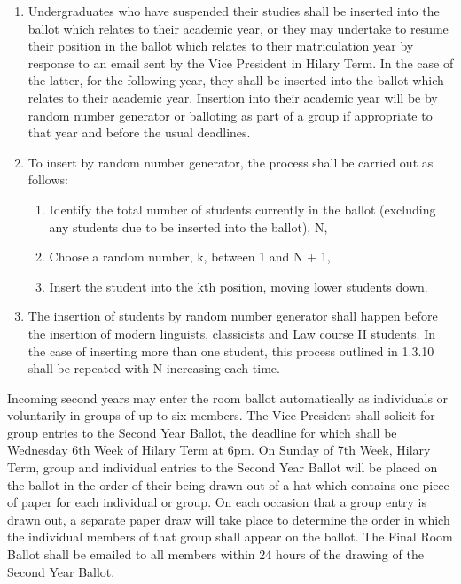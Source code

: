 \begin{enumerate}
\item Undergraduates who have suspended their studies shall be inserted into the ballot which relates to their academic year, or they may undertake to resume their position in the ballot which relates to their matriculation year by response to an email sent by the Vice President in Hilary Term. In the case of the latter, for the following year, they shall be inserted into the ballot which relates to their academic year. Insertion into their academic year will be by random number generator or balloting as part of a group if appropriate to that year and before the usual deadlines.
\item To insert by random number generator, the process shall be carried out as follows:
\begin{enumerate}
\item Identify the total number of students currently in the ballot (excluding any students due to be inserted into the ballot), N,
\item Choose a random number, k, between 1 and N + 1,
\item Insert the student into the kth position, moving lower students down.
\end{enumerate}
\item The insertion of students by random number generator shall happen before the insertion of modern linguists, classicists and Law course II students. In the case of inserting more than one student, this process outlined in 1.3.10 shall be repeated with N increasing each time.
\end{enumerate}

\appnpara Incoming second years may enter the room ballot automatically as individuals or voluntarily in groups of up to six members.
\appnpara The Vice President shall solicit for group entries to the Second Year Ballot, the deadline for which shall be Wednesday 6th Week of Hilary Term at 6pm.
\appnpara On Sunday of 7th Week, Hilary Term, group and individual entries to the Second Year Ballot will be placed on the ballot in the order of their being drawn out of a hat which contains one piece of paper for each individual or group. On each occasion that a group entry is drawn out, a separate paper draw will take place to determine the order in which the individual members of that group shall appear on the ballot.
\appnpara The Final Room Ballot shall be emailed to all members within 24 hours of the drawing of the Second Year Ballot.

